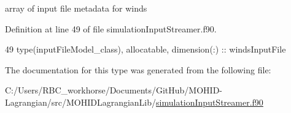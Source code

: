 array of input file metadata for winds 



Definition at line 49 of file simulation\+Input\+Streamer.\+f90.


\begin{DoxyCode}
49         \textcolor{keywordtype}{type}(inputFileModel\_class), \textcolor{keywordtype}{allocatable}, \textcolor{keywordtype}{dimension(:)} :: windsInputFile
\end{DoxyCode}


The documentation for this type was generated from the following file\+:\begin{DoxyCompactItemize}
\item 
C\+:/\+Users/\+R\+B\+C\+\_\+workhorse/\+Documents/\+Git\+Hub/\+M\+O\+H\+I\+D-\/\+Lagrangian/src/\+M\+O\+H\+I\+D\+Lagrangian\+Lib/\mbox{\hyperlink{simulation_input_streamer_8f90}{simulation\+Input\+Streamer.\+f90}}\end{DoxyCompactItemize}
